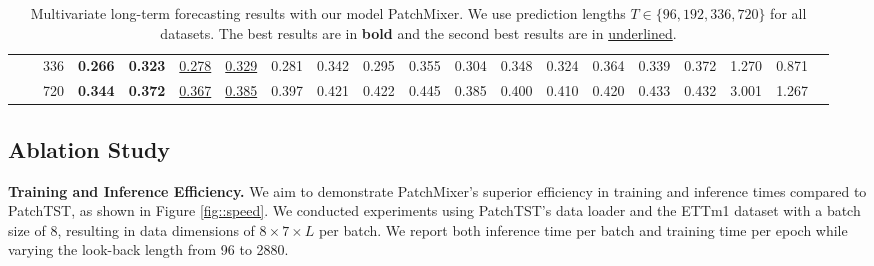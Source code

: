 \documentclass{article} \usepackage{iclr2024_conference,times}
\begin{document}
\begin{table}[ht]
{\begin{tabular}{cc|c|cc|cc|cc|cc|cc|cc|cc|ccc}
            &\multicolumn{1}{c|}{}& 336   & \textbf{0.266} & \textbf{0.323} & \uline{0.278} & \uline{0.329} & 0.281                                                    & 0.342  & 0.295                                                    & 0.355                                                  & 0.304                                                    & 0.348                                                    & 0.324                                                     & 0.364                                                    & 0.339                                                     & 0.372                                                     & 1.270                                                    & 0.871                                                  \\
            &\multicolumn{1}{c|}{}& 720 & \textbf{0.344} & \textbf{0.372} & \uline{0.367} & \uline{0.385}  & 0.397                                                    & 0.421 & 0.422                                                    & 0.445                                                    & 0.385                                                    & 0.400                                                    & 0.410                                                     & 0.420                                                    & 0.433                                                     & 0.432                                                     & 3.001                                                    & 1.267                                                    \\
			\cline{2-19}
		\end{tabular}
	}
	\caption{Multivariate long-term forecasting results with our model PatchMixer. We use prediction lengths $T\in \{96, 192, 336, 720\}$ for all datasets. The best results are in \textbf{bold} and the second best results are in \uline{underlined}.}
	\label{tab::multivariate}
\end{table}
\linespread{1}



\subsection{Ablation Study}
\label{sec::ablation}

\noindent \textbf{Training and Inference Efficiency.} We aim to demonstrate PatchMixer's superior efficiency in training and inference times compared to PatchTST, as shown in Figure \ref{fig::speed}. We conducted experiments using PatchTST's data loader and the ETTm1 dataset with a batch size of 8, resulting in data dimensions of $8 \times 7 \times L$ per batch. We report both inference time per batch and training time per epoch while varying the look-back length from 96 to 2880.
\end{document}
